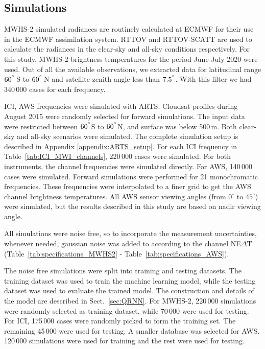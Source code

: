 \documentclass[amt]{copernicus}
\begin{document}
\subsection{Simulations}
%
MWHS-2 simulated radiances are routinely calculated at ECMWF for their use in the ECMWF assimilation system. RTTOV and RTTOV-SCATT are used to calculate the radiances in the clear-sky and all-sky conditions respectively. For this study, MWHS-2 brightness temperatures for the period June-July 2020 were used. Out of all the available observations, we extracted data for latitudinal range $60^{^{\circ}}$\,S to $60^{^{\circ}}$\,N and satellite zenith angle less than $7.5^{^{\circ}}$. With this filter we had 340\,000 cases for each frequency. 

ICI, AWS frequencies were simulated with ARTS. Cloudsat profiles during August 2015 were randomly selected for forward simulations. The input data were restricted between $60^{^{\circ}}$S to $60^{^{\circ}}$N, and surface was below 500\,m. Both clear-sky and all-sky scenarios were simulated. The complete simulation setup is described in Appendix \ref{appendix:ARTS_setup}. For each ICI frequency in Table~\ref{tab:ICI_MWI_channels}, 220\,000 cases were simulated. For both instruments, the channel frequencies were simulated directly. For AWS, 140\,000 cases were simulated. Forward simulations were performed for 21 monochromatic frequencies. These frequencies were interpolated to a finer grid to get the AWS channel brightness temperatures. All AWS sensor viewing angles (from $0^\circ$ to $45^\circ$) were simulated, but the results described in this study are based on nadir viewing angle. 

All simulations were noise free, so to incorporate the measurement uncertainties, whenever needed, gaussian noise was added to according to the channel NE$\Delta$T (Table~\ref{tab:specifications_MWHS2} - Table~\ref{tab:specifications_AWS}).

The noise free simulations were split into training and testing datasets. The training dataset was used to train the machine learning model, while the testing dataset was used to evaluate the trained model. The construction and details of the model are described in Sect.~\ref{sec:QRNN}. For MWHS-2, 220\,000 simulations were randomly selected as training dataset, while 70\,000 were used for testing. For ICI, 175\,000 cases were randomly picked to form the training set. The remaining 45\,000 were used for testing. A smaller database was selected for AWS. 120\,000 simulations were used for training and the rest were used for testing.
\end{document}
